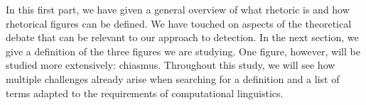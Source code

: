 %
%

In this first part, we have given a general overview of what rhetoric is and how rhetorical figures can be defined. We have touched on aspects of the theoretical debate that can be relevant to our approach to detection. In the next section, we give a definition of the three figures we are studying. One figure, however, will be studied more extensively: chiasmus. Throughout this study, we will see how multiple challenges already arise when searching for a definition and a list of terms adapted to the requirements of computational linguistics.\clearpage

